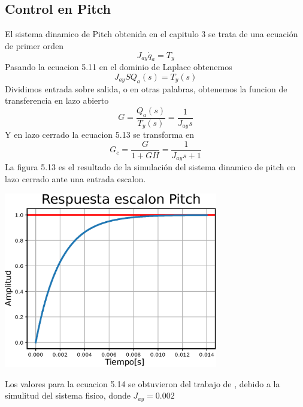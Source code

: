 \subsection{Control en Pitch}
El sistema dinamico de Pitch obtenida en el capitulo 3 se trata de una ecuación de primer orden
\begin{equation}
	J_{ay}\dot{q}_a = T_y
\end{equation}
Pasando la ecuacion 5.11 en el dominio de Laplace obtenemos
\begin{equation}
	J_{ay}SQ_a(s) = T_y(s)
\end{equation}
Dividimos entrada sobre salida, o en otras palabras, obtenemos la funcion de transferencia en lazo abierto
\begin{equation}
	G = \frac{Q_a(s)}{T_y(s)} =  \frac{1}{J_{ay}s}
\end{equation}
Y en lazo cerrado la ecuacion 5.13 se transforma en 
\begin{equation}
	G_c = \frac{G}{1 +GH} = \frac{1}{J_{ay}s+1}
\end{equation}
La figura 5.13 es el resultado de la simulación del sistema dinamico de pitch en lazo cerrado ante una entrada escalon.
\begin{center}
	\includegraphics[width=0.7\textwidth]{Contenido/Cuerpo/Capitulo5/Fig35.eps}
	\label{Fig4}
\end{center}
Los valores para la ecuacion 5.14 se obtuvieron del trabajo de \cite{Paper::Abdo2013}, debido a la simulitud del sistema fisico, donde 
$J_{ay} = 0.002$ 

